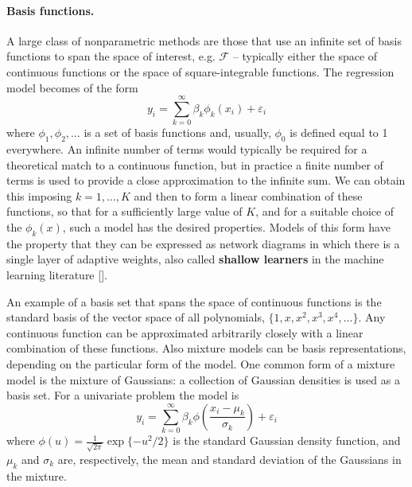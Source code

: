 \paragraph{Basis functions.} A large class of nonparametric methods are those that use an infinite set of basis functions to span the space of interest, e.g. $\mathcal{F}$ -- typically either the space of continuous functions or the space of square-integrable functions. The regression model becomes of the form
$$y_i = \sum_{k = 0}^{\infty} \beta_k \phi_k(x_i) + \varepsilon_i$$
where $\phi_1, \phi_2, \dots$ is a set of basis functions and, usually, $\phi_0$ is defined equal to 1 everywhere. 
An infinite number of terms would typically be required for a theoretical match to a continuous function, but in practice a finite number of terms is used to provide a close approximation to the infinite sum. We can obtain this imposing $k = 1,\dots,K$ and then to form a linear combination of these functions, so that for a sufficiently large value of $K$, and for a suitable choice of the $\phi_k(x)$, such a model has the desired  properties. Models of this form have the property that they
can be expressed as network diagrams in which there is a single layer of adaptive weights, also called \textbf{shallow learners} in the machine learning literature [\cite{Polson2017}].

An example of a basis set that spans the space of continuous functions is the standard basis of the vector space of all polynomials, $\{1, x, x^2, x^3, x^4, \dots\}$. Any continuous function can be approximated arbitrarily closely with a linear combination of these functions. Also mixture models can be basis representations, depending on the particular form of the model. One common form of a mixture model is the mixture of Gaussians: a collection of Gaussian densities is used as a basis set. For a univariate problem the model is
$$y_i = \sum_{k=0}^{\infty}\beta_k \phi\left(\frac{x_i - \mu_k}{\sigma_k}\right) + \varepsilon_i$$
where $\phi(u) = \frac{1}{\sqrt{2\pi}}\exp\{-u^2/2\}$ is the standard Gaussian density function, and $\mu_k$ and $\sigma_k$ are, respectively, the mean and standard deviation of the Gaussians in the mixture.


